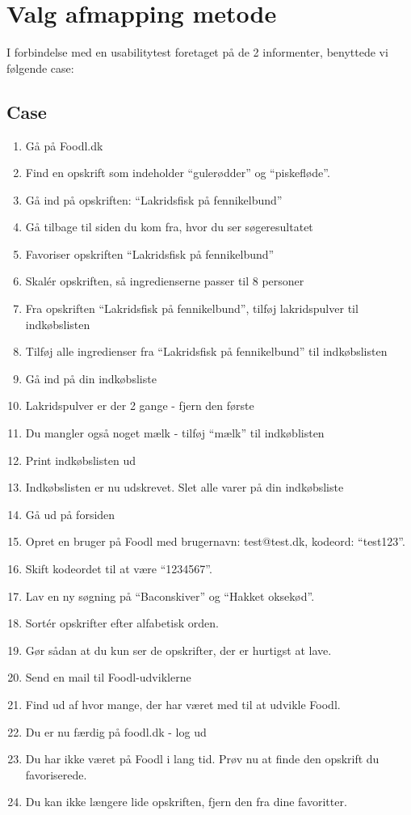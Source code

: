\chapter{Valg afmapping metode}
\label{ap:usabilitytest}

I forbindelse med en usabilitytest foretaget på de 2 informenter, benyttede vi følgende case:

\section{Case}
\begin{enumerate}
\item Gå på Foodl.dk
\item Find en opskrift som indeholder “gulerødder” og “piskefløde”.
\item Gå ind på opskriften: “Lakridsfisk på fennikelbund”
\item Gå tilbage til siden du kom fra, hvor du ser søgeresultatet
\item Favoriser opskriften “Lakridsfisk på fennikelbund”
\item Skalér opskriften, så ingredienserne passer til 8 personer
\item Fra opskriften “Lakridsfisk på fennikelbund”, tilføj lakridspulver til indkøbslisten
\item Tilføj alle ingredienser fra “Lakridsfisk på fennikelbund” til indkøbslisten
\item Gå ind på din indkøbsliste
\item Lakridspulver er der 2 gange - fjern den første
\item Du mangler også noget mælk - tilføj “mælk” til indkøblisten
\item Print indkøbslisten ud
\item Indkøbslisten er nu udskrevet. Slet alle varer på din indkøbsliste
\item Gå ud på forsiden
\item Opret en bruger på Foodl med brugernavn: test@test.dk, kodeord: “test123”.
\item Skift kodeordet til at være “1234567”.
\item Lav en ny søgning på “Baconskiver” og “Hakket oksekød”.
\item Sortér opskrifter efter alfabetisk orden.
\item Gør sådan at du kun ser de opskrifter, der er hurtigst at lave.
\item Send en mail til Foodl-udviklerne
\item Find ud af hvor mange, der har været med til at udvikle Foodl.
\item Du er nu færdig på foodl.dk - log ud
\item Du har ikke været på Foodl i lang tid. Prøv nu at finde den opskrift du favoriserede.
\item Du kan ikke længere lide opskriften, fjern den fra dine favoritter.
\end{enumerate}